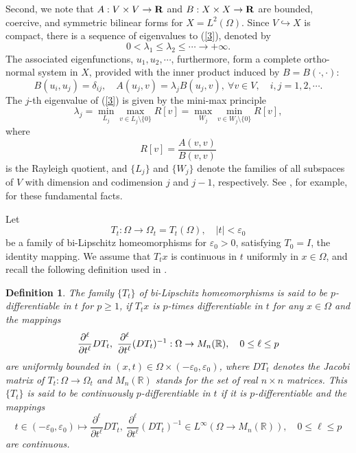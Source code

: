 \documentclass[final,a4paper]{jmsj}
\newcommand{\R}{\mathbb R}
\theoremstyle{thmstyleone}%
\theoremstyle{thmstyletwo}%
\theoremstyle{thmstylethree}%
\newtheorem{definition}{Definition}%
\begin{document}
Second, we note that $A:V\times V\rightarrow {\bf R}$ and $B:X\times X\rightarrow {\bf R}$ are bounded, coercive, and symmetric bilinear forms for $X=L^2(\Omega)$. Since $V\hookrightarrow X$ is compact, there is a sequence of eigenvalues to (\ref{3}), denoted by 
\[ 0<\lambda_1\leq \lambda_2\leq \cdots \rightarrow +\infty. \] 
The associated eigenfunctions, $u_1, u_2, \cdots$, furthermore, form a complete ortho-normal system in $X$, provided with the inner product induced by $B=B(\cdot, \cdot)$: 
\[ B(u_i, u_j)=\delta_{ij}, \quad A(u_j, v)=\lambda_jB(u_j, v), \ \forall v \in V, \quad i,j=1,2,\cdots. \]  
The $j$-th eigenvalue of (\ref{3}) is given by the mini-max principle 
\begin{equation} 
\lambda_j=\min_{L_j}\max_{v\in L_j\setminus \{0\}}R[v]=\max_{W_j}\min_{v\in W_j\setminus \{0\}}R[v], 
 \label{minimax}
\end{equation} 
where 
\[ R[v]=\frac{A(v,v)}{B(v,v)} \] 
is the Rayleigh quotient, and $\{ L_j\}$ and $\{ W_j\}$ denote the families of all subspaces of $V$ with dimension and codimension $j$ and $j-1$, respectively.  See  \cite{suzuki22}, for example, for these fundamental facts.    

Let  
\begin{equation} 
T_t : \Omega\rightarrow \Omega_t= T_t(\Omega), \quad \vert t\vert < \varepsilon_0   
 \label{13}
\end{equation} 
be a family of bi-Lipschitz homeomorphisms for $\varepsilon_0>0$, satisfying $T_0=I$, the identity mapping. We assume that $T_tx$ is continuous in $t$ uniformly in $x\in \Omega$, and recall the following definition used in \cite{st22}.  

\begin{definition}\label{def1} 
The family  $\{ T_t\}$ of bi-Lipschitz homeomorphisms is said to be $p$-differentiable in $t$ for $p\geq 1$, if $T_tx$ is  $p$-times differentiable in $t$ for any $x\in\Omega$ and the mappings 
\[ 
\frac{\partial^\ell}{\partial t^\ell}DT_t, \ \frac{\partial^\ell}{\partial t^\ell}(DT_t)^{-1}:\Omega \rightarrow M_n(\R), \quad 0\leq \ell \leq p  \nonumber\\  
\] 
are uniformly bounded in $(x,t)\in \Omega\times (-\varepsilon_0, \varepsilon_0)$, where $DT_t$ denotes the Jacobi matrix of $T_t:\Omega \rightarrow \Omega_t$ and $M_n(\R)$ stands for the set of real $n\times n$ matrices. This $\{ T_t\}$ is said to be continuously $p$-differentiable in $t$ if it is $p$-differentiable and the mappings 
\[ 
t\in (-\varepsilon_0, \varepsilon_0)\mapsto \frac{\partial^\ell}{\partial t^\ell}DT_t, \ \frac{\partial^\ell}{\partial t^\ell}(DT_t)^{-1} \in L^\infty(\Omega \rightarrow M_n(\R)), \quad 0\leq \ell \leq p  \] 
are continuous.  
\end{definition}
\end{document}
